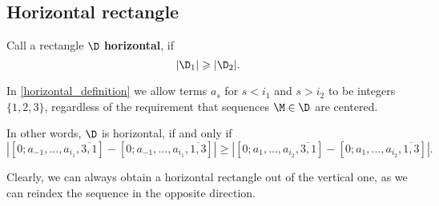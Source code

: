 \subsection{Horizontal rectangle}

\begin{definition}
	Call a rectangle $\D$ \textbf{horizontal}, if
	\begin{equation}
		\label{horizontal_definition}
		|\D_1| \geqslant |\D_2|.
	\end{equation}
\end{definition}

In \ref{horizontal_definition} we allow terms $a_s$ for $s < i_1$ and $s > i_2$
to be integers $\{1, 2, 3\}$,
regardless of the requirement that sequences $\M \in \D$ are centered.

In other words, $\D$ is horizontal, if and only if
\begin{equation*}
	\left| [0; a_{-1}, ..., a_{i_1}, \overline{3, 1}] - [0; a_{-1}, ..., a_{i_1}, \overline{1, 3}] \right| \geqslant
	\left| [0; a_{1}, ..., a_{i_2}, \overline{3, 1}] - [0; a_{1}, ..., a_{i_2}, \overline{1, 3}] \right|.
\end{equation*}

Clearly, we can always obtain a horizontal rectangle out of the vertical one,
as we can reindex the sequence in the opposite direction.
